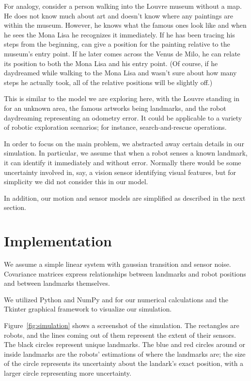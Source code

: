 \documentclass[prodmode,acmtecs]{acmsmall} %
\begin{document}
For analogy, consider a person walking into the Louvre museum without a map.  He does not know much about art and doesn't know where any paintings are within the museum.  However, he knows what the famous ones look like and when he sees the Mona Lisa he recognizes it immediately. If he has been tracing his steps from the beginning, can give a position for the painting relative to the museum's entry point.  If he later comes across the Venus de Milo, he can relate its position to both the Mona Lisa and his entry point.  (Of course, if he daydreamed while walking to the Mona Lisa and wasn't sure about how many steps he actually took, all of the relative positions will be slightly off.)

This is similar to the model we are exploring here, with the Louvre standing in for an unknown area, the famous artworks being landmarks, and the robot daydreaming representing an odometry error.  It could be applicable to a variety of robotic exploration scenarios; for instance, search-and-rescue operations.

In order to focus on the main problem, we abstracted away certain details in our simulation.  In particular, we assume that when a robot senses a known landmark, it can identify it immediately and without error.  Normally there would be some uncertainty involved in, say, a vision sensor identifying visual features, but for simplicity we did not consider this in our model.

In addition, our motion and sensor models are simplified as described in the next section.

\section{Implementation}

We assume a simple linear system with gaussian transition and sensor noise.  Covariance matrices express relationships between landmarks and robot positions and between landmarks themselves.  

We utilized Python and NumPy and for our numerical calculations and the Tkinter graphical framework to visualize our simulation.

Figure~\ref{fig:simulation} shows a screenshot of the simulation.  The rectangles are robots, and the lines coming out of them represent the extent of their sensors.  The black circles represent unique landmarks.  The blue and red circles around or inside landmarks are the robots' estimations of where the landmarks are; the size of the circle represents its uncertainty about the landark's exact position, with a larger circle representing more uncertainty.
\end{document}
